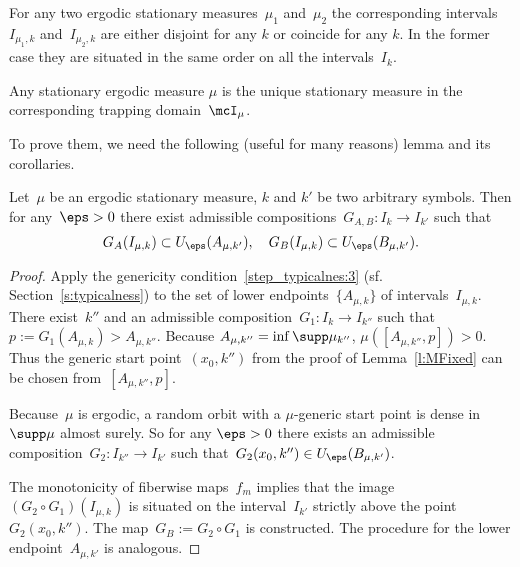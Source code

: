 \documentclass[a4paper,12pt]{amsart}
\begin{document}
\begin{Lem}\label{l:Markov-intervals}
For any two ergodic stationary measures~$\mu_1$ and~$\mu_2$ the corresponding intervals~$I_{\mu_1,k}$ and~$I_{\mu_2,k}$ are either disjoint for any $k$ or coincide for any $k$. In the former case they are situated in the same order on all the intervals~$I_{k}$.
\end{Lem}

\begin{Lem}\label{l:Markov-uniqueness}
Any stationary ergodic measure $\mu$ is the unique stationary measure in the corresponding trapping domain~$\mcI_\mu$. 
\end{Lem}

To prove them, we need the following (useful for many reasons) lemma and its corollaries.

\begin{Lem}\label{l:Markov-contractions}
Let~$\mu$ be an ergodic stationary measure, $k$ and $k'$ be two arbitrary symbols. Then for any~$\eps > 0$ there exist admissible compositions~$G_{A, B} \colon I_k \to I_{k'}$ such that
$$
G_A (I_{\mu,k}) \subset U_\eps (A_{\mu,k'}), \quad G_B (I_{\mu,k}) \subset U_\eps (B_{\mu,k'}).
$$
\end{Lem}

\begin{proof}
Apply the genericity condition~\ref{step_typicalnes:3} (sf. Section~\ref{s:typicalness}) to the set of lower endpoints~$\{A_{\mu,k}\}$ of intervals~$I_{\mu,k}$. There exist~$k''$ and an admissible composition~$G_1 \colon I_k \to I_{k''}$ such that $p := G_1(A_{\mu,k}) > A_{\mu,k''}$. Because $A_{\mu,k''} = \inf \supp \mu_{k''}$, $\mu([A_{\mu,k''},p]) > 0$. Thus the generic start point~$(x_0,k'')$ from the proof of Lemma~\ref{l:MFixed} can be chosen from~$[A_{\mu,k''},p]$.

Because~$\mu$ is ergodic, a random orbit with a $\mu$-generic start point is dense in $\supp\mu$ almost surely. So for any $\eps > 0$ there exists an admissible composition~$G_2 \colon I_{k''} \to I_{k'}$ such that~$G_2(x_0, k'') \in U_\eps (B_{\mu,k'})$.



The monotonicity of fiberwise maps~$f_m$ implies that the image~$(G_2 \circ G_1) (I_{\mu,k})$ is situated on the interval~$I_{k'}$ strictly above the point~$G_2(x_0, k'')$. The map~$G_B := G_2 \circ G_1$ is constructed. The procedure for the lower endpoint~$A_{\mu,k'}$ is analogous.
\end{proof}
\end{document}

